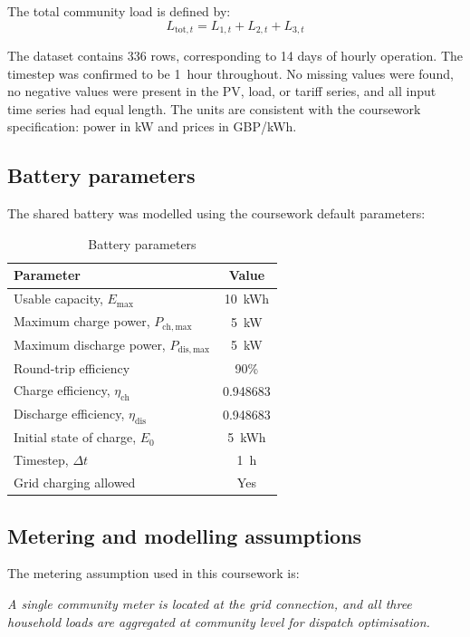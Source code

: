 \documentclass[12pt,a4paper]{article}
\begin{document}
The total community load is defined by:
\[
L_{\mathrm{tot},t} = L_{1,t} + L_{2,t} + L_{3,t}
\]

The dataset contains 336 rows, corresponding to 14 days of hourly operation. The timestep was confirmed to be \SI{1}{hour} throughout. No missing values were found, no negative values were present in the PV, load, or tariff series, and all input time series had equal length. The units are consistent with the coursework specification: power in \si{kW} and prices in \si{GBP/kWh}.

\subsection{Battery parameters}

The shared battery was modelled using the coursework default parameters:

\begin{table}[H]
\centering
\caption{Battery parameters}
\begin{tabular}{>{\raggedright\arraybackslash}p{8cm}c}
\toprule
Parameter & Value \\
\midrule
Usable capacity, $E_{\max}$ & \SI{10}{kWh} \\
Maximum charge power, $P_{\mathrm{ch,max}}$ & \SI{5}{kW} \\
Maximum discharge power, $P_{\mathrm{dis,max}}$ & \SI{5}{kW} \\
Round-trip efficiency & 90\% \\
Charge efficiency, $\eta_{\mathrm{ch}}$ & 0.948683 \\
Discharge efficiency, $\eta_{\mathrm{dis}}$ & 0.948683 \\
Initial state of charge, $E_0$ & \SI{5}{kWh} \\
Timestep, $\Delta t$ & \SI{1}{h} \\
Grid charging allowed & Yes \\
\bottomrule
\end{tabular}
\end{table}

\subsection{Metering and modelling assumptions}

The metering assumption used in this coursework is:

\emph{A single community meter is located at the grid connection, and all three household loads are aggregated at community level for dispatch optimisation.}
\end{document}
